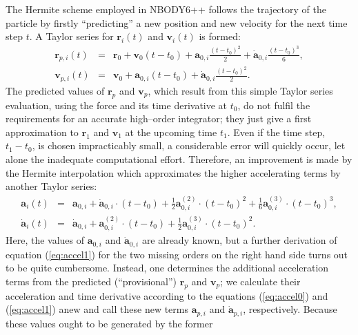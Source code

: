 The Hermite scheme employed in NBODY6++ follows the trajectory
of the particle by firstly ``predicting'' a new position
and new velocity for the next time step $t$.
A Taylor series for $\mathbf r_i(t)$ and $\mathbf v_i(t)$
is formed:
%
\begin{eqnarray}
\mathbf r_{p,i}(t) &=& \mathbf r_0
                + \mathbf v_0(t-t_0)
                + \mathbf a_{0,i}\frac{(t-t_0)^2}{2}
                + \dot{\mathbf a}_{0,i}\frac{(t-t_0)^3}{6} ,
         \label{eq:predr} \\
%
\mathbf v_{p,i}(t) &=&  \mathbf v_0
                + \mathbf a_{0,i}(t-t_0)
                + \dot{\mathbf a}_{0,i}\frac{(t-t_0)^2}{2} .
          \label{eq:predv}
\end{eqnarray}
%
The predicted values of $\mathbf r_p$ and $\mathbf v_p$,
which result from this simple Taylor series evaluation,
using the force and its time derivative at $t_0$,
do not fulfil the requirements for an accurate
high--order integrator;
they just give a first approximation to $\mathbf r_1$
and $\mathbf v_1$ at the upcoming time $t_1$.
Even if the time step, $t_1 - t_0$, is chosen
impracticably small, a considerable error will
quickly occur, let alone the inadequate
computational effort.
Therefore, an improvement is made by the Hermite
interpolation which approximates the higher
accelerating terms by another Taylor series:
%
\begin{eqnarray}
\mathbf a_i(t) &=& \mathbf a_{0,i}
                   + \dot{\mathbf a}_{0,i} \cdot (t - t_0)
                   + \frac{1}{2}\mathbf a_{0,i}^{(2)} \cdot (t-t_0)^2
                   + \frac{1}{6}\mathbf a_{0,i}^{(3)} \cdot (t-t_0)^3 ,
          \label{eq:accp0} \\
%
\dot{\mathbf a}_i(t) &=& \dot{\mathbf a}_{0,i}
                   + \mathbf a_{0,i}^{(2)} \cdot (t-t_0)
                   + \frac{1}{2}\mathbf a_{0,i}^{(3)} \cdot (t-t_0)^2 .
          \label{eq:accp1}
\end{eqnarray}
%
Here, the values of $\mathbf a_{0,i}$ and $\dot{\mathbf a}_{0,i}$
are already known, but a further derivation of equation
(\ref{eq:accel1}) for the two missing orders on the right
hand side turns out to be quite cumbersome.
Instead, one determines the additional acceleration terms
from the predicted (``provisional'') $\mathbf r_p$ and
$\mathbf v_p$;
we calculate their acceleration and time derivative
according to the equations (\ref{eq:accel0}) and
(\ref{eq:accel1}) anew and call these new terms
$\mathbf a_{p,i}$ and $\dot{\mathbf a}_{p,i}$,
respectively.
Because these values ought to be generated by the former
